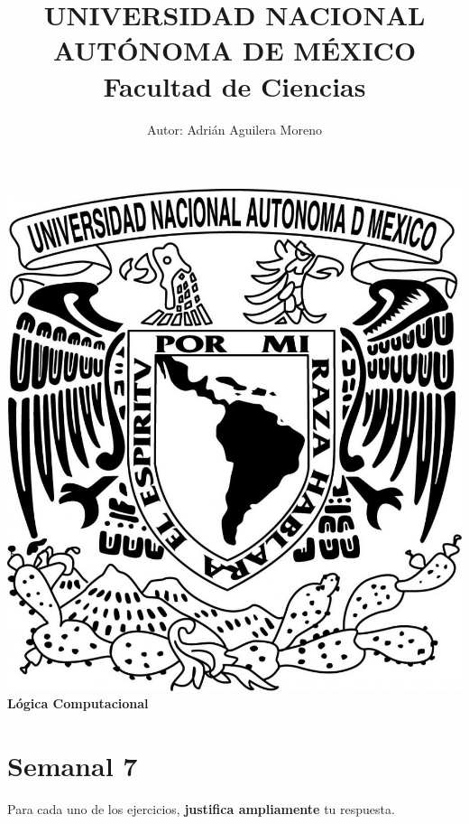 \documentclass{article}
\begin{document}
\title{UNIVERSIDAD NACIONAL AUT\'ONOMA DE M\'EXICO\\ Facultad de Ciencias}
\author{Autor: Adri\'an Aguilera Moreno}
\date{}
\maketitle
\begin{center}
  \includegraphics[scale=0.20]{../Imagen/Portada.jpg}\\[0.4cm]
  \Large
  \bf{Lógica Computacional}
  \normalsize
\end{center}
\newpage
{}
\section*{\LARGE{Semanal 7}}
Para cada uno de los ejercicios, \textbf{justifica ampliamente} tu respuesta.
\end{document}
